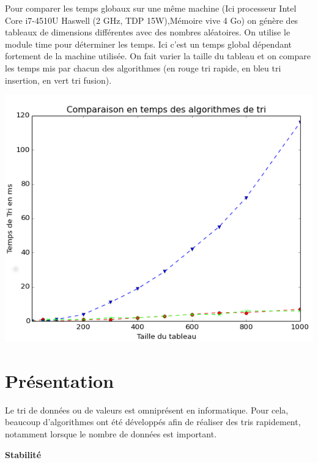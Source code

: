 \begin{exemple2}

Pour comparer les temps globaux sur une même machine (Ici processeur	Intel Core i7-4510U Haswell (2 GHz, TDP 15W),Mémoire vive 4 Go) on génère des tableaux de dimensions différentes avec des nombres aléatoires.
On utilise le module time pour déterminer les temps. Ici c'est un temps global dépendant fortement de la machine utilisée.
On fait varier la taille du tableau et on compare les temps mis par chacun des algorithmes (en rouge tri rapide, en bleu tri insertion, en vert tri fusion). 

\begin{center}
\includegraphics[width=.7\textwidth]{images/Fin.png}
\end{center}

\end{exemple2}




\begin{thebibliography}{2}




\end{thebibliography}

\section{Présentation}
Le tri de données ou de valeurs est omniprésent en informatique. Pour cela, beaucoup d'algorithmes ont été développés afin de réaliser des tris rapidement, notamment lorsque le nombre de données est important.
\begin{defi}\textbf{Stabilité}

\end{defi}

